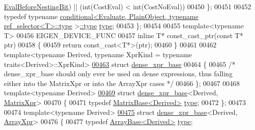\begin{DoxyCode}
{      \hyperlink{group__flags_gaa34e83bae46a8eeae4e69ebe3aaecbed}{EvalBeforeNestingBit}) || (\textcolor{keywordtype}{int}(CostEval) < int(CostNoEval))
00450   \};
00451 
00452   \textcolor{keyword}{typedef} \textcolor{keyword}{typename} 
      \hyperlink{struct_eigen_1_1internal_1_1conditional}{conditional<Evaluate, PlainObject, typename ref\_selector<T>::type}
      >\hyperlink{class_eigen_1_1internal_1_1_tensor_lazy_evaluator_writable}{::type} \hyperlink{class_eigen_1_1internal_1_1_tensor_lazy_evaluator_writable}{type};
00453 \};
00454 
00455 \textcolor{keyword}{template}<\textcolor{keyword}{typename} T>
00456 EIGEN\_DEVICE\_FUNC
00457 \textcolor{keyword}{inline} T* const\_cast\_ptr(\textcolor{keyword}{const} T* ptr)
00458 \{
00459   \textcolor{keywordflow}{return} \textcolor{keyword}{const\_cast<}T*\textcolor{keyword}{>}(ptr);
00460 \}
00461 
00462 template<typename Derived, typename XprKind = typename traits<Derived>::XprKind>
\hyperlink{struct_eigen_1_1internal_1_1dense__xpr__base}{00463} \textcolor{keyword}{struct }\hyperlink{struct_eigen_1_1internal_1_1dense__xpr__base}{dense\_xpr\_base}
00464 \{
00465   \textcolor{comment}{/* dense\_xpr\_base should only ever be used on dense expressions, thus falling either into the MatrixXpr
       or into the ArrayXpr cases */}
00466 \};
00467 
00468 \textcolor{keyword}{template}<\textcolor{keyword}{typename} Derived>
\hyperlink{struct_eigen_1_1internal_1_1dense__xpr__base_3_01_derived_00_01_matrix_xpr_01_4}{00469} \textcolor{keyword}{struct }\hyperlink{struct_eigen_1_1internal_1_1dense__xpr__base}{dense\_xpr\_base}<Derived, \hyperlink{struct_eigen_1_1_matrix_xpr}{MatrixXpr}>
00470 \{
00471   \textcolor{keyword}{typedef} \hyperlink{group___core___module_class_eigen_1_1_matrix_base}{MatrixBase<Derived>} \hyperlink{group___core___module_class_eigen_1_1_matrix_base}{type};
00472 \};
00473 
00474 \textcolor{keyword}{template}<\textcolor{keyword}{typename} Derived>
\hyperlink{struct_eigen_1_1internal_1_1dense__xpr__base_3_01_derived_00_01_array_xpr_01_4}{00475} \textcolor{keyword}{struct }\hyperlink{struct_eigen_1_1internal_1_1dense__xpr__base}{dense\_xpr\_base}<Derived, \hyperlink{struct_eigen_1_1_array_xpr}{ArrayXpr}>
00476 \{
00477   \textcolor{keyword}{typedef} \hyperlink{group___core___module_class_eigen_1_1_array_base}{ArrayBase<Derived>} \hyperlink{group___core___module_class_eigen_1_1_array_base}{type};
}
\end{DoxyCode}

